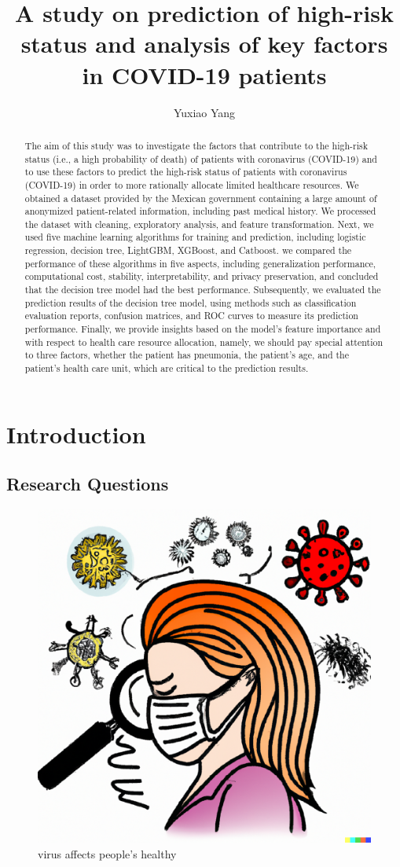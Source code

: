 \documentclass[
  journal=medium,
  manuscript=Report,
  year=2023,
  volume=37,
]{cup-journal}
\title{A study on prediction of high-risk status and analysis of key factors in COVID-19 patients}
\author{Yuxiao Yang}
\affiliation{Xi'an Jiaotong University, Xi'an, China}
\begin{document}
\begin{abstract}

    The aim of this study was to investigate the factors that contribute to the high-risk status (i.e., a high probability of death) of patients with coronavirus (COVID-19) and to use these factors to predict the high-risk status of patients with coronavirus (COVID-19) in order to more rationally allocate limited healthcare resources. We obtained a dataset provided by the Mexican government containing a large amount of anonymized patient-related information, including past medical history. We processed the dataset with cleaning, exploratory analysis, and feature transformation. Next, we used five machine learning algorithms for training and prediction, including logistic regression, decision tree, LightGBM, XGBoost, and Catboost. we compared the performance of these algorithms in five aspects, including generalization performance, computational cost, stability, interpretability, and privacy preservation, and concluded that the decision tree model had the best performance. Subsequently, we evaluated the prediction results of the decision tree model, using methods such as classification evaluation reports, confusion matrices, and ROC curves to measure its prediction performance. Finally, we provide insights based on the model's feature importance and with respect to health care resource allocation, namely, we should pay special attention to three factors, whether the patient has pneumonia, the patient's age, and the patient's health care unit, which are critical to the prediction results.

\end{abstract}

\section{Introduction}

\subsection{Research Questions}

\begin{figure}[hbt!]
    \centering
    \includegraphics[width=0.4\linewidth]{pic/virus affects people's healthy.png}
    \caption{virus affects people's healthy}
    \label{begin}
\end{figure}
    
\end{document}
